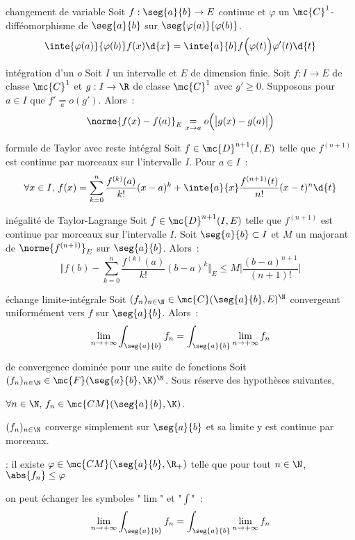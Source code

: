 \begin{adjustwidth}{-3cm}{-3cm}
\begin{theoreme}{10.39}{changement de variable}
    Soit $f:\seg{a}{b}\to E$ continue et $\varphi$ un $\mc{C}^1$-difféomorphisme de $\seg{a}{b}$ sur $\seg{\varphi(a)}{\varphi(b)}$.
    $$\inte{\varphi(a)}{\varphi(b)}f(x)\d{x} = \inte{a}{b}f\Bigl(\varphi(t)\Bigr)\varphi'(t)\d{t}$$
\end{theoreme}

\begin{theoreme}{10.42}{intégration d'un $o$}
    Soit $I$ un intervalle et $E$ de dimension finie. Soit $f:I \to E$ de classe $\mc{C}^1$ et $g:I\to \R$ de classe $\mc{C}^1$ avec $g' \geq 0$. Supposons pour $a \in I$ que $f' \underset{a}{=}o(g')$. Alors~:
    $$\norme{f(x) - f(a)}_E \underset{x \to a}{=} o\Big(\big\vert g(x) - g(a) \big\vert\Big)$$
\end{theoreme}

\begin{theoreme}{10.47}{formule de Taylor avec reste intégral}
    Soit $f\in \mc{D}^{n+1}(I,E)$ telle que $f^{(n+1)}$ est continue par morceaux sur l'intervalle $I$. Pour $a \in I$~:
    $$\forall x \in I,\, f(x) = \sum_{k=0}^n \frac{f^{(k)}(a)}{k!}(x-a)^k + \inte{a}{x}\frac{f^{(n+1)}(t)}{n!}(x-t)^n \d{t}$$
\end{theoreme}


\begin{theoreme}{10.48}{inégalité de Taylor-Lagrange}
    Soit $f\in \mc{D}^{n+1}(I,E)$ telle que $f^{(n+1)}$ est continue par morceaux sur l'intervalle $I$. Soit $\seg{a}{b} \subset I$ et $M$ un majorant de $\norme{f^{(n+1)}}_E$ sur $\seg{a}{b}$. Alors~:
    $$\Bigg\Vert f(b) - \sum_{k=0}^n \frac{f^{(k)}(a)}{k!}(b-a)^k\Bigg\Vert_E \leq M \bigg\vert \frac{(b-a)^{n+1}}{(n+1)!} \bigg\vert$$
\end{theoreme}

\begin{theoreme}{10.57}{échange limite-intégrale}
    Soit $(f_n)_{n \in \N} \in \mc{C}(\seg{a}{b},E)^\N$ convergeant uniformément vers $f$ sur $\seg{a}{b}$. Alors~:
    $$\lim_{n \to +\infty} \int_{\seg{a}{b}} f_n = \int_{\seg{a}{b}} \lim_{n \to +\infty} f_n $$
\end{theoreme}

\begin{theoreme}{10.62}{de convergence dominée pour une suite de fonctions}
    Soit $(f_n)_{n \in \N} \in \mc{F}(\seg{a}{b},\K)^\N$. Sous réserve des hypothèses suivantes,
    \begin{enumeratebf}
        \item $\forall n \in \N,\, f_n \in \mc{CM}(\seg{a}{b},\K)$.
        \item $(f_n)_{n \in \N}$ converge simplement sur $\seg{a}{b}$ et sa limite y est continue par morceaux.
        \item {} : il existe $\varphi \in \mc{CM}(\seg{a}{b}, \R_+)$  telle que pour tout $n \in \N$,\, $\abs{f_n} \leq \varphi$
    \end{enumeratebf}
    on peut échanger les symboles "$\lim$" et "$\int$"~:
    $$\lim_{n \to +\infty} \int_{\seg{a}{b}} f_n = \int_{\seg{a}{b}} \lim_{n \to +\infty} f_n $$
\end{theoreme}


\end{adjustwidth}
